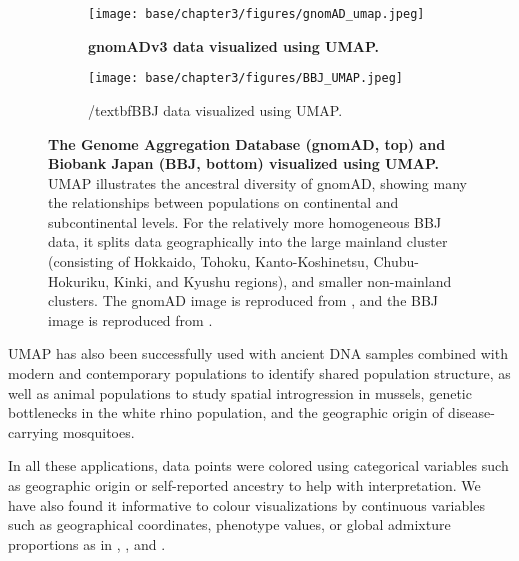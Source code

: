 \begin{figure}[h!]
  \centering
  \begin{subfigure}[b]{0.5\linewidth}
    \texttt{[image: base/chapter3/figures/gnomAD\_umap.jpeg]}
    \caption{\textbf{gnomADv3 data visualized using UMAP.}}
    \label{fig:gnomAD_UMAP}
  \end{subfigure}

  \begin{subfigure}[b]{0.5\linewidth}
    \texttt{[image: base/chapter3/figures/BBJ\_UMAP.jpeg]}
    \caption{/textbf{BBJ data visualized using UMAP.}}
    \label{fig:BBJ_UMAP}
  \end{subfigure}
  \caption[UMAP of gnomAD and Biobank Japan]{\textbf{The Genome Aggregation Database (gnomAD, top) and Biobank Japan (BBJ, bottom) visualized using UMAP.} UMAP illustrates the ancestral diversity of gnomAD, showing many the relationships between populations on continental and subcontinental levels. For the relatively more homogeneous BBJ data, it splits data geographically into the large mainland cluster (consisting of Hokkaido, Tohoku, Kanto-Koshinetsu, Chubu-Hokuriku, Kinki, and Kyushu regions), and smaller non-mainland clusters. The gnomAD image is reproduced from \citep{karczewski_mutational_2020}, and the BBJ image is reproduced from \citep{sakaue_dimensionality_2020}.
  }
  \label{fig:external_UMAP}
\end{figure}

\clearpage

UMAP has also been successfully used with ancient DNA samples combined with modern and contemporary populations to identify shared population structure\citep{margaryan_population_2019}, as well as animal populations to study spatial introgression in mussels\citep{simon_local_2019}, genetic bottlenecks in the white rhino population\citep{sanchez-barreiro_historical_2020}, and the geographic origin of disease-carrying mosquitoes\citep{consortium_genome_2020}\citep{schmidt2020population}. 

In all these applications, data points were colored using categorical variables such as geographic origin or self-reported ancestry to help with interpretation. We have also found it informative to colour visualizations by continuous variables such as geographical coordinates, phenotype values, or global admixture proportions as in \citep{diaz-papkovich_umap_2019}, \citep{dai_population_2020}, and \citep{spear2020recent}.

